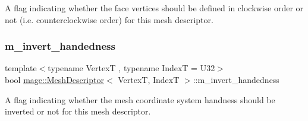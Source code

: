 A flag indicating whether the face vertices should be defined in clockwise order or not (i.\+e. counterclockwise order) for this mesh descriptor. \hypertarget{structmage_1_1_mesh_descriptor_a95491d0719f524589192d74fe5622bf8}{}\label{structmage_1_1_mesh_descriptor_a95491d0719f524589192d74fe5622bf8} 
\subsubsection{\texorpdfstring{m\+\_\+invert\+\_\+handedness}{m\_invert\_handedness}}
{\footnotesize\ttfamily template$<$typename VertexT , typename IndexT  = U32$>$ \\
bool \hyperlink{structmage_1_1_mesh_descriptor}{mage\+::\+Mesh\+Descriptor}$<$ VertexT, IndexT $>$\+::m\+\_\+invert\+\_\+handedness\hspace{0.3cm}{\ttfamily [private]}}

A flag indicating whether the mesh coordinate system handness should be inverted or not for this mesh descriptor. 